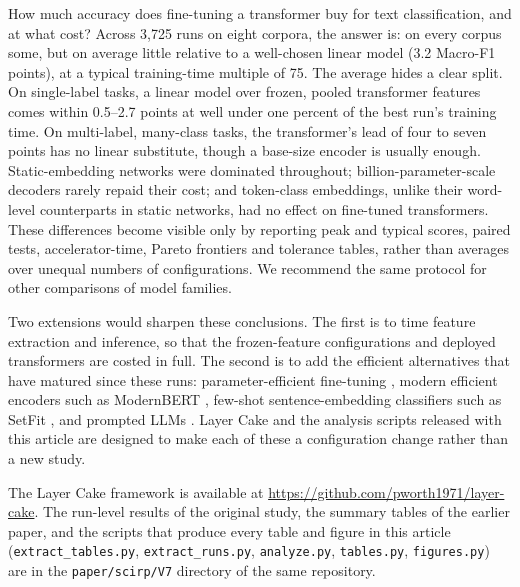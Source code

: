 \documentclass{ijis}
\begin{document}
How much accuracy does fine-tuning a transformer buy for text classification, and at what cost? Across 3,725 runs on eight corpora, the answer is: on every corpus some, but on average little relative to a well-chosen linear model (3.2 Macro-F1 points), at a typical training-time multiple of 75. The average hides a clear split. On single-label tasks, a linear model over frozen, pooled transformer features comes within 0.5--2.7 points at well under one percent of the best run's training time. On multi-label, many-class tasks, the transformer's lead of four to seven points has no linear substitute, though a base-size encoder is usually enough. Static-embedding networks were dominated throughout; billion-parameter-scale decoders rarely repaid their cost; and token-class embeddings, unlike their word-level counterparts in static networks, had no effect on fine-tuned transformers. These differences become visible only by reporting peak and typical scores, paired tests, accelerator-time, Pareto frontiers and tolerance tables, rather than averages over unequal numbers of configurations. We recommend the same protocol for other comparisons of model families.

Two extensions would sharpen these conclusions. The first is to time feature extraction and inference, so that the frozen-feature configurations and deployed transformers are costed in full. The second is to add the efficient alternatives that have matured since these runs: parameter-efficient fine-tuning \cite{hu2021loralowrankadaptationlarge,dettmers2023qloraefficientfinetuningquantized}, modern efficient encoders such as ModernBERT \cite{warner2024modernbert}, few-shot sentence-embedding classifiers such as SetFit \cite{tunstall2022setfit}, and prompted LLMs \cite{edwards2024language}. Layer Cake and the analysis scripts released with this article are designed to make each of these a configuration change rather than a new study.

The Layer Cake framework is available at \url{https://github.com/pworth1971/layer-cake}. The run-level results of the original study, the summary tables of the earlier paper, and the scripts that produce every table and figure in this article (\texttt{extract\_tables.py}, \texttt{extract\_runs.py}, \texttt{analyze.py}, \texttt{tables.py}, \texttt{figures.py}) are in the \texttt{paper/scirp/V7} directory of the same repository.
\end{document}
